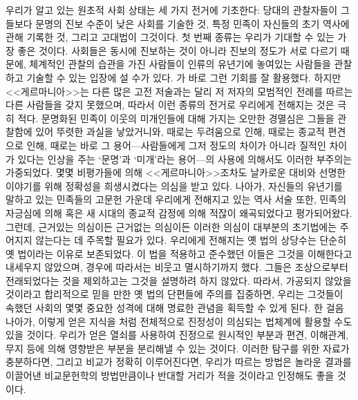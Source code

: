 우리가 알고 있는 원초적 사회 상태는 세 가지 전거에 기초한다:
\hypertarget{contemporary}{당대의}
관찰자들이 그들보다 문명의 진보 수준이 낮은 사회를 기술한 것,
특정 민족이 자신들의 초기 역사에 관해 기록한 것,
그리고 고대법이 그것이다.
첫 번째 종류는 우리가 기대할 수 있는 가장 좋은 것이다.
사회들은 동시에 진보하는 것이 아니라 진보의 정도가 서로 다르기 때문에,
체계적인 관찰의 습관을 가진 사람들이 인류의 유년기에 놓여있는 사람들을
관찰하고 기술할 수 있는 입장에 설 수가 있다.
가 바로 그런 기회를 잘 활용했다.
하지만 <<게르마니아>>는 다른 많은 고전 저술과는 달리
저 저자의 모범적인 전례를 따르는 다른 사람들을 갖지 못했으며,
따라서 이런 종류의 전거로 우리에게 전해지는 것은 극히 적다.
문명화된 민족이 이웃의 미개인들에 대해 가지는 오만한 경멸심은
그들을 관찰함에 있어 뚜렷한 과실을 낳았거니와,
때로는 두려움으로 인해, 때로는 종교적 편견으로 인해,
때로는 바로 그 용어---사람들에게 그저 정도의 차이가 아니라 질적인 차이가
있다는 인상을 주는 `문명'과 `미개'라는
용어---의 사용에 의해서도
이러한 부주의는 가중되었다.
몇몇 비평가들에 의해
<<게르마니아>>조차도
날카로운 대비와 선명한 이야기를 위해 정확성을 희생시켰다는 의심을 받고 있다.
나아가, 자신들의 유년기를 말하고 있는 민족들의 고문헌 가운데
우리에게 전해지고 있는 역사 서술 또한,
민족의 자긍심에 의해 혹은 새 시대의 종교적 감정에 의해
적잖이 왜곡되었다고 평가되어왔다.
그런데, 근거있는 의심이든 근거없는 의심이든 이러한 의심이
대부분의 초기법에는 주어지지 않는다는 데 주목할 필요가 있다.
우리에게 전해지는 옛 법의 상당수는
단순히 옛 법이라는 이유로 보존되었다.
이 법을 적용하고 준수했던 이들은 그것을 이해한다고 내세우지 않았으며,
경우에 따라서는 비웃고 멸시하기까지 했다.
그들은 조상으로부터 전래되었다는 것을 제외하고는 그것을 설명하려 하지 않았다.
따라서, 가공되지 않았을 것이라고 합리적으로 믿을 만한 옛 법의 단편들에
주의를 집중하면, 우리는 그것들이 속했던 사회의 몇몇 중요한 성격에 대해
명료한 관념을 획득할 수 있게 된다.
한 걸음 나아가, 이렇게 얻은 지식을 처럼
전체적으로
진정성이
의심되는 법체계에 활용할 수도 있을 것이다.
우리가 얻은 열쇠를 사용하여 진정으로 원시적인 부분과
편견, 이해관계, 무지 등에 의해 영향받은 부분을 분리해낼 수 있는 것이다.
이러한 탐구를 위한 자료가 충분하다면,
그리고 비교가 정확히 이루어진다면,
우리가 따르는 방법은 놀라운 결과를 이끌어낸 비교문헌학의 방법만큼이나
반대할 거리가 적을 것이라고 인정해도 좋을 것이다.

